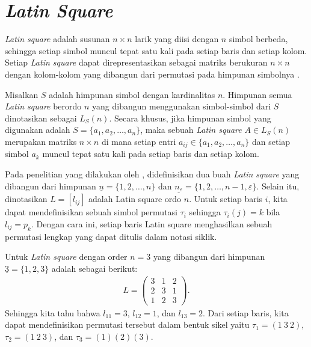 \section{\textit{Latin Square}}
\textit{Latin square} adalah susunan $n \times n$ larik yang diisi dengan $n$ simbol berbeda, sehingga setiap simbol muncul tepat satu kali pada setiap baris dan setiap kolom. Setiap \textit{Latin square} dapat direpresentasikan sebagai matriks berukuran $n \times n$ dengan kolom-kolom yang dibangun dari permutasi pada himpunan simbolnya \parencite{mufid2014eigenvalues}.

Misalkan $S$ adalah himpunan simbol dengan kardinalitas $n$. Himpunan semua \textit{Latin square} berordo $n$ yang dibangun menggunakan simbol-simbol dari $S$ dinotasikan sebagai $L_S(n)$. Secara khusus, jika himpunan simbol yang digunakan adalah $S=\{a_1, a_2, \ldots, a_n\}$, maka sebuah \textit{Latin square} $A \in L_S(n)$ merupakan matriks $n \times n$ di mana setiap entri $a_{ij} \in \{a_1, a_2, \ldots, a_n\}$ dan setiap simbol $a_k$ muncul tepat satu kali pada setiap baris dan setiap kolom.

Pada penelitian yang dilakukan oleh \textcite{trivialeigenvectorsym14061101}, didefinisikan dua buah \textit{Latin square} yang dibangun dari himpunan $\underline{n}=\{1,2,\ldots,n\}$ dan $\underline{n_\varepsilon}=\{1,2,\ldots,n-1,\varepsilon\}$.
Selain itu, dinotasikan $L = [l_{ij}]$ adalah Latin square ordo $n$. Untuk setiap baris $i$, kita dapat mendefinisikan sebuah simbol permutasi $\tau_i$ sehingga $\tau_i(j)=k$ bila $l_{ij}=p_k$. Dengan cara ini, setiap baris Latin square menghasilkan sebuah permutasi lengkap yang dapat ditulis dalam notasi siklik.

\begin{contoh}
  Untuk \textit{Latin square} dengan order $n=3$ yang dibangun dari himpunan $\underline{3}=\{1,2,3\}$ adalah sebagai berikut:
  \begin{align*}
    L =
    \begin{pmatrix}
      3 & 1 & 2 \\
      2 & 3 & 1 \\
      1 & 2 & 3
    \end{pmatrix}.
  \end{align*}
  Sehingga kita tahu bahwa $l_{11}=3$, $l_{12}=1$, dan $l_{13}=2$. Dari setiap baris, kita dapat mendefinisikan permutasi tersebut dalam bentuk sikel yaitu $\tau_1=(1\ 3\ 2)$, $\tau_2=(1\ 2\ 3)$, dan $\tau_3=(1)(2)(3)$.
\end{contoh}

